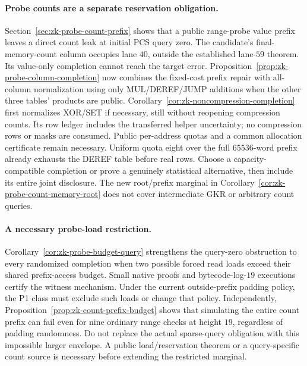 \paragraph{Probe counts are a separate reservation obligation.} Section~\ref{sec:zk-probe-count-prefix} shows that a public range-probe value prefix leaves a direct count leak at initial PCS query zero. The candidate's final-memory-count column occupies lane $40$, outside the established lane-$59$ theorem. Its value-only completion cannot reach the target error. Proposition~\ref{prop:zk-probe-column-completion} now combines the fixed-cost prefix repair with all-column normalization using only MUL/DEREF/JUMP additions when the other three tables' products are public. Corollary~\ref{cor:zk-noncompression-completion} first normalizes XOR/SET if necessary, still without reopening compression counts. Its row ledger includes the transferred helper uncertainty; no compression rows or masks are consumed. Public per-address quotas and a common allocation certificate remain necessary. Uniform quota eight over the full $65536$-word prefix already exhausts the DEREF table before real rows. Choose a capacity-compatible completion or prove a genuinely statistical alternative, then include its entire joint disclosure. The new root/prefix marginal in Corollary~\ref{cor:zk-probe-count-memory-root} does not cover intermediate GKR or arbitrary count queries.

\paragraph{A necessary probe-load restriction.} Corollary~\ref{cor:zk-probe-budget-query} strengthens the query-zero obstruction to every randomized completion when two possible forced read loads exceed their shared prefix-access budget. Small native proofs and bytecode-log-$19$ executions certify the witness mechanism. Under the current outside-prefix padding policy, the P1 class must exclude such loads or change that policy. Independently, Proposition~\ref{prop:zk-count-prefix-budget} shows that simulating the entire count prefix can fail even for nine ordinary range checks at height $19$, regardless of padding randomness. Do not replace the actual sparse-query obligation with this impossible larger envelope. A public load/reservation theorem or a query-specific count source is necessary before extending the restricted marginal.

